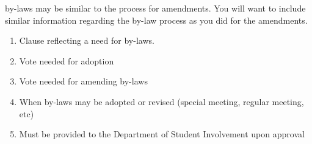 \begin{enumerate}
by-laws may be similar to the process for amendments.  You will want to include
similar information regarding the by-law process as you did for the amendments.
    \begin{enumerate}
      \item	Clause reflecting a need for by-laws.
      \item	Vote needed for adoption
      \item	Vote needed for amending by-laws
      \item	When by-laws may be adopted or revised (special meeting, regular
      meeting, etc)
      \item	Must be provided to the Department of Student Involvement upon
      approval
    \end{enumerate}
\end{enumerate}

